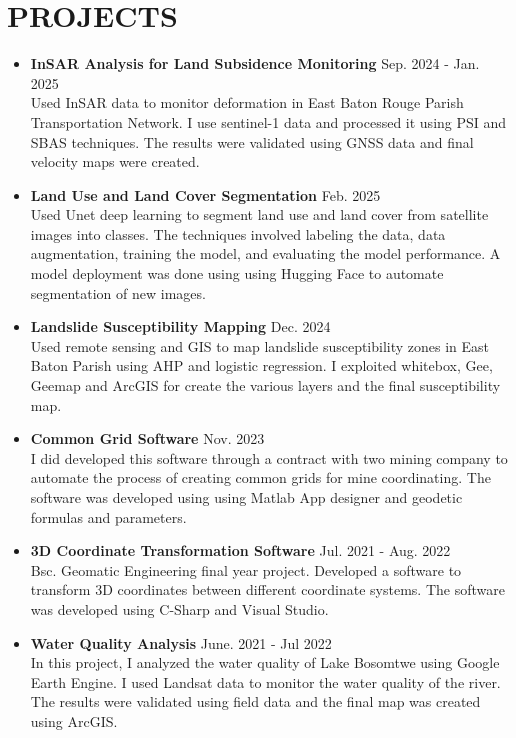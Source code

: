 \documentclass[a4paper,10pt]{article}
\begin{document}
\section*{PROJECTS} 
\begin{itemize}[leftmargin=*]
    \item \textbf{InSAR Analysis for Land Subsidence Monitoring} \hfill Sep. 2024 {-} Jan. 2025 \\
    Used InSAR data to monitor deformation in East Baton Rouge Parish Transportation Network. I use sentinel-1 data 
    and processed it using PSI and SBAS techniques. The results were validated using GNSS data and final velocity maps were created.

    \item \textbf{Land Use and Land Cover Segmentation} \hfill Feb. 2025 \\
    Used Unet deep learning to segment land use and land cover from satellite images into classes. The techniques involved
    labeling the data, data augmentation, training the model, and evaluating the model performance.
    A model deployment was done using using Hugging Face to automate segmentation of new images.


    \item \textbf{Landslide Susceptibility Mapping} \hfill Dec. 2024\\
    Used remote sensing and GIS to map landslide susceptibility zones in East Baton Parish
    using AHP and logistic regression. I exploited whitebox, Gee, Geemap and ArcGIS for 
    create the various layers and the final susceptibility map.

    \item \textbf{Common Grid Software} \hfill Nov. 2023 \\
   I did developed this software through a contract with two mining company to automate the process of creating common grids for
   mine coordinating. The software was developed using using Matlab App designer and geodetic formulas and parameters.

    \item \textbf{3D Coordinate Transformation Software} \hfill Jul. 2021 {-} Aug. 2022 \\
    Bsc. Geomatic Engineering final year project. Developed a software to transform 3D coordinates between
    different coordinate systems. The software was developed using C-Sharp and Visual Studio.

    \item \textbf{Water Quality Analysis} \hfill June. 2021 {-} Jul 2022 \\
    In this project, I analyzed the water quality of Lake Bosomtwe using Google Earth Engine. I used Landsat data to
    monitor the water quality of the river. The results were validated using field data and the final map was created using ArcGIS.


\end{itemize}
\end{document}
